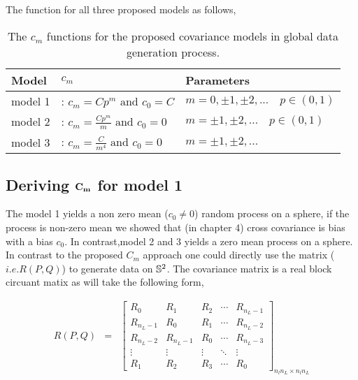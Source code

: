 The \Cm function for all three proposed models as follows, 
				\begin{table}[H]
				\centering
				\begin{tabular}{|l|l|l|}
					\hline
					Model   & $c_m$                                         & Parameters                               \\ 
					\hline \hline
					model 1 & : $c_m = Cp^m  \mbox{ and } c_0 = C$          & $m=0, \pm 1, \pm 2,... \quad p\in (0,1)$ \\
					model 2 & : $c_m = \frac{Cp^m}{m} \mbox{ and } c_0 = 0$ & $m=\pm 1, \pm 2,... \quad p\in (0,1)$    \\
					model 3 & : $c_m = \frac{C}{m^4} \mbox{ and } c_0 = 0$  & $m=\pm 1, \pm 2,...$                     \\
					\hline
				\end{tabular}
				\label{Cm_table}
				\caption{The $c_m$ functions for the proposed covariance models in global data generation process.}
			\end{table}

	\subsection{\bf Deriving ${\bf C_m}$ for model 1}
		
	
 The model 1 yields a non zero mean ($c_0 \ne 0$) random process on a sphere, if the process is non-zero mean we showed that (in chapter 4) cross covariance is bias with a bias $c_0$. In contrast,model 2 and 3 yields a zero mean process on a sphere. \\
 
 In contrast to the proposed $C_m$ approach one could directly use the \cov matrix ($i.e. R(P,Q)$) to generate data on $\mathbb{S}^2$. The covariance matrix is a real block circuant matix as will take the following form,
 
 \begin{eqnarray}
	R(P,Q) &=& \left[
		\begin{array}{lllll}
			R_0     & R_1     & R_2    & \cdots & R_{n_L-1} \\
			R_{n_L-1} & R_0     & R_1    & \cdots & R_{n_L-2} \\
			R_{n_L-2} & R_{n_L-1} & R_0    & \cdots & R_{n_L-3} \\
			\vdots  & \vdots  & \vdots & \ddots & \vdots  \\
			R_1     & R_2     & R_3    & \cdots & R_0
		\end{array}
	\right]_{n_ln_L\times n_ln_L}
\end{eqnarray}

